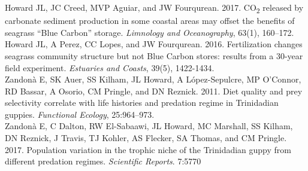 \noindent
Howard JL, JC Creed, MVP Aguiar, and JW Fourqurean. 2017. CO\textsubscript{2} released by carbonate sediment production in some coastal areas may offset the benefits of seagrass “Blue Carbon” storage. {\em Limnology and Oceanography}, 63(1), 160–172.\\[1ex]

\noindent
Howard JL, A Perez, CC Lopes, and JW Fourqurean. 2016. Fertilization changes seagrass community structure but not Blue Carbon stores: results from a 30-year field experiment. {\em Estuaries and Coasts}, 39(5), 1422-1434.\\[1ex]

\noindent
Zandonà E, SK Auer, SS Kilham, JL Howard, A López-Sepulcre, MP O’Connor, RD Bassar, A Osorio, CM Pringle, and DN Reznick. 2011. Diet quality and prey selectivity correlate with life histories and predation regime in Trinidadian guppies. {\em Functional Ecology}, 25:964–973.\\[2ex]

\noindent
Zandonà E, C Dalton, RW El-Sabaawi, JL Howard, MC Marshall, SS Kilham, DN Reznick, J Travis, TJ Kohler, AS Flecker, SA Thomas, and CM Pringle. 2017. Population variation in the trophic niche of the Trinidadian guppy from different predation regimes. {\em Scientific Reports}. 7:5770\\[1ex]

\noindent
